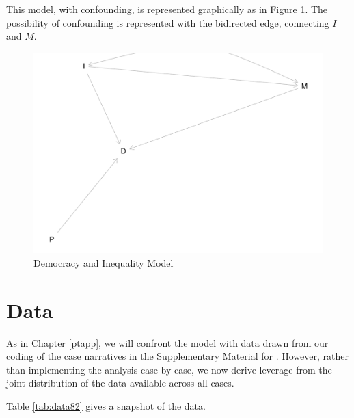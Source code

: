 \documentclass[
  12pt,
]{book}
\begin{document}
This model, with confounding, is represented graphically as in Figure \ref{fig:pimdgraph}. The possibility of confounding is represented with the bidirected edge, connecting \(I\) and \(M\).

\begin{figure}

{\centering \includegraphics{ii_files/figure-latex/pimdgraph-1} 

}

\caption{Democracy and Inequality Model}\label{fig:pimdgraph}
\end{figure}

\hypertarget{data}{%
\section{Data}\label{data}}

As in Chapter \ref{ptapp}, we will confront the model with data drawn from our coding of the case narratives in the Supplementary Material for \citet{haggard2012inequality}. However, rather than implementing the analysis case-by-case, we now derive leverage from the joint distribution of the data available across all cases.

Table \ref{tab:data82} gives a snapshot of the data.
\end{document}
